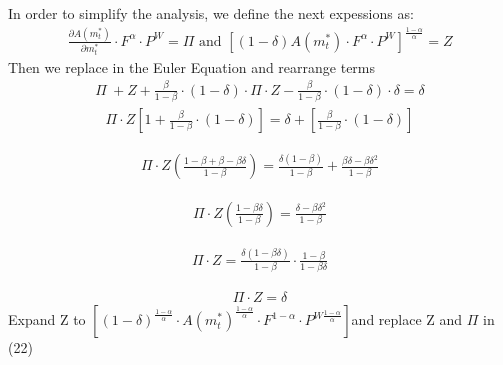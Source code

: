 \documentclass[12pt]{article}
\begin{document}
\normalsize
In order to simplify the analysis, we define the next expessions as:
\begin{equation}
\begin{aligned}
\frac{\partial A(m^\ast_t)}{\partial m^\ast_t}\cdot F^\alpha\cdot P^W=\Pi\text{   and   }\left[(1-\delta)A(m^\ast_t)\cdot F^\alpha \cdot P^W\right]^\frac{1-\alpha}{\alpha}=Z
\end{aligned}
\end{equation}
\normalsize
Then we replace in the Euler Equation and rearrange terms
\begin{equation}
\begin{aligned}
\Pi\ +Z+\frac{\beta}{1-\beta}\cdot (1-\delta)\cdot \Pi\cdot Z-\frac{\beta}{1-\beta}\cdot (1-\delta)\cdot \delta=\delta
\end{aligned}
\end{equation}
\begin{equation}
\begin{aligned}
\Pi\cdot Z \left[1+\frac{\beta}{1-\beta}\cdot (1-\delta)\right]=\delta +\left[\frac{\beta}{1-\beta}\cdot (1-\delta)\right]
\end{aligned}
\end{equation}

\begin{equation}
\begin{aligned}
\Pi\cdot Z\left(\frac{1-\beta+\beta-\beta\delta}{1-\beta}\right)=\frac{\delta(1-\beta)}{1-\beta}+\frac{\beta\delta-\beta\delta^2}{1-\beta}
\end{aligned}
\end{equation}

\begin{equation}
\begin{aligned}
\Pi\cdot Z\left(\frac{1-\beta\delta}{1-\beta}\right)=\frac{\delta-\beta\delta^2}{1-\beta}
\end{aligned}
\end{equation}

\begin{equation}
\begin{aligned}
\Pi\cdot Z=\frac{\delta(1-\beta\delta)}{1-\beta}\cdot\frac{1-\beta}{1-\beta\delta}
\end{aligned}
\end{equation}

\begin{equation}
\begin{aligned}
\Pi\cdot Z=\delta
\end{aligned}
\end{equation}
\normalsize
Expand Z to $\left[(1-\delta)^\frac{1-\alpha}{\alpha}\cdot A(m^\ast_t)^\frac{1-\alpha}{\alpha}\cdot F^{1-\alpha}\cdot P^{W\frac{1-\alpha}{\alpha}}\right]$and replace Z and $\Pi$ in (22) 
\end{document}
